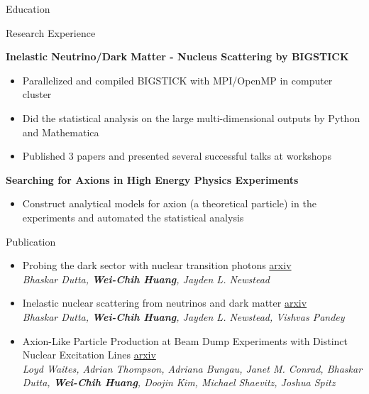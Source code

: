 \documentclass{resume}
\begin{document}
\begin{rSection}{Education}
\begin{rSection}{Research Experience}
\vspace{-1.25em}
\item \textbf{Inelastic Neutrino/Dark Matter - Nucleus Scattering by BIGSTICK}
    \begin{itemize}
    \itemsep -3pt {}
    \item Parallelized and compiled BIGSTICK with MPI/OpenMP in computer cluster
    \item Did the statistical analysis on the large multi-dimensional outputs by Python and Mathematica
    \item Published 3 papers and presented several successful talks at workshops
    \end{itemize}
\item \textbf{Searching for Axions in High Energy Physics Experiments}
    \begin{itemize}
    \itemsep -3pt {}
    \item Construct analytical models for axion (a theoretical particle) in the experiments and automated the statistical analysis
    \end{itemize}
\end{rSection}


\begin{rSection}{Publication}
    \begin{itemize}
        \item Probing the dark sector with nuclear transition photons \hfill \href{https://arxiv.org/pdf/2302.10250.pdf}{arxiv}\\
        {\footnotesize \it Bhaskar Dutta, \textbf{Wei-Chih Huang}, Jayden L. Newstead}
        \item Inelastic nuclear scattering from neutrinos and dark matter \hfill \href{https://arxiv.org/pdf/2206.08590.pdf}{arxiv}\\
        {\footnotesize \it Bhaskar Dutta, \textbf{Wei-Chih Huang}, Jayden L. Newstead, Vishvas Pandey}
        \item Axion-Like Particle Production at Beam Dump Experiments with Distinct Nuclear Excitation Lines \hfill \href{https://arxiv.org/pdf/2207.13659.pdf}{arxiv}\\
        {\footnotesize \it Loyd Waites, Adrian Thompson, Adriana Bungau, Janet M. Conrad, Bhaskar Dutta, \textbf{Wei-Chih Huang}, Doojin Kim, Michael Shaevitz, Joshua Spitz}
    \end{itemize}
\end{rSection}



\end{rSection}
\end{document}
